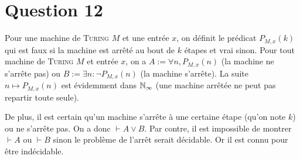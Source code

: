 \section*{Question 12}

Pour une machine de \textsc{Turing} $M$ et une entrée $x$, on définit le prédicat $P_{M,x}(k)$ qui est faux si la machine est arrêté au bout de $k$ étapes et vrai sinon. Pour tout machine de \textsc{Turing} $M$ et entrée $x$, on a $A:=\forall n, P_{M,x}(n)$ (la machine ne s'arrête pas) ou $B:=\exists n : \neg P_{M,x}(n)$ (la machine s'arrête). La suite $n\mapsto P_{M,x}(n)$ est évidemment dans $\mathbb{N}_\infty$ (une machine arrêtée ne peut pas repartir toute seule).

De plus, il est certain qu'un machine s'arrête à une certaine étape (qu'on note $k$) ou ne s'arrête pas. On a donc $\vdash A\vee B$. Par contre, il est impossible de montrer $\vdash A$ ou $\vdash B$ sinon le problème de l'arrêt serait décidable. Or il est connu pour être indécidable.

